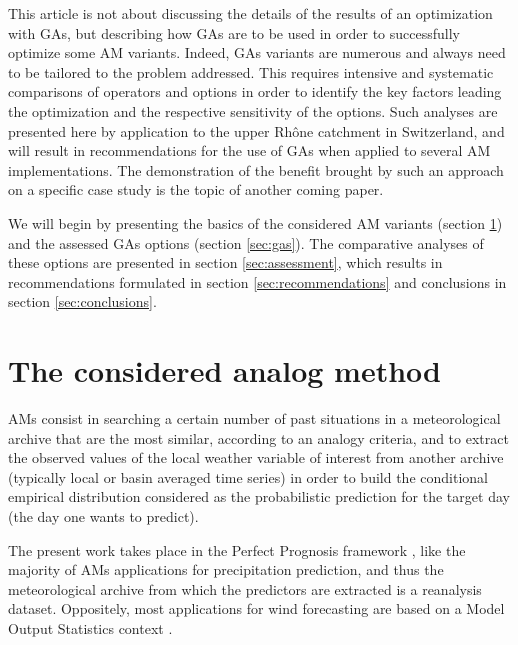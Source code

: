 \documentclass{ametsoc}
\begin{document}
This article is not about discussing the details of the results of an optimization with GAs, but describing how GAs are to be used in order to successfully optimize some AM variants. Indeed, GAs variants are numerous and always need to be tailored to the problem addressed. This requires intensive and systematic comparisons of operators and options in order to identify the key factors leading the optimization and the respective sensitivity of the options. Such analyses are presented here by application to the upper Rh\^{o}ne catchment in Switzerland, and will result in recommendations for the use of GAs when applied to several AM implementations. The demonstration of the benefit brought by such an approach on a specific case study is the topic of another coming paper. 

We will begin by presenting the basics of the considered AM variants (section \ref{sec:am}) and the assessed GAs options (section \ref{sec:gas}). The comparative analyses of these options are presented in section \ref{sec:assessment}, which results in recommendations formulated in section \ref{sec:recommendations} and conclusions in section \ref{sec:conclusions}.


\section{The considered analog method}
\label{sec:am}


AMs consist in searching a certain number of past situations in a meteorological archive that are the most similar, according to an analogy criteria, and to extract the observed values of the local weather variable of interest from another archive (typically local or basin averaged time series) in order to build the conditional empirical distribution considered as the probabilistic prediction for the target day (the day one wants to predict).

The present work takes place in the Perfect Prognosis framework \citep{Klein1963}, like the majority of AMs applications for precipitation prediction, and thus the meteorological archive from which the predictors are extracted is a reanalysis dataset. Oppositely, most applications for wind forecasting are based on a Model Output Statistics \citep[MOS, see][]{Glahn1972} context \citep[e.g.][]{DelleMonache2013, DelleMonache2011, Alessandrini2015, Junk2015, Junk2015c}.
\end{document}
